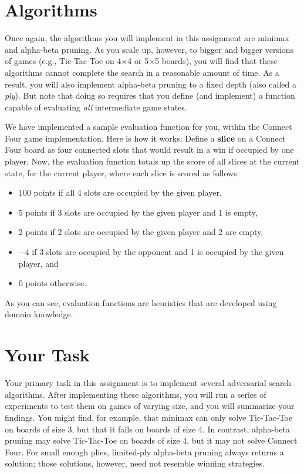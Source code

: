 \documentclass{article}
\begin{document}
\section{Algorithms}
Once again, the algorithms you will implement in this assignment are minimax and alpha-beta pruning.
As you scale up, however, to bigger and bigger versions of games (e.g., Tic-Tac-Toe on 4$\times$4 or
5$\times$5 boards),
you will find that these algorithms cannot complete the search in a reasonable amount of time.
As a result, you will also implement alpha-beta pruning to a fixed depth (also called a \textit{ply}).
But note that doing so requires that you define (and implement) a function
capable of evaluating \emph{all\/} intermediate game states.

We have implemented a sample evaluation function for you, within the Connect Four game implementation.
Here is how it works:
Define a \textbf{slice} on a Connect Four board as
four connected slots that would result in a win if occupied by one player.
Now, the evaluation function totals up the score of all slices at the current state,
for the current player, where each slice is scored as follows:
\begin{itemize}
  \item 100 points if all 4 slots are occupied by the given player,
  \item 5 points if 3 slots are occupied by the given player and 1 is empty,
  \item 2 points if 2 slots are occupied by the given player and 2 are empty,
  \item $-$4 if 3 slots are occupied by the opponent and 1 is occupied by the given player, and
  \item 0 points otherwise.
\end{itemize}
As you can see, evaluation functions are heuristics that are developed using domain knowledge.


\section{Your Task}
Your primary task in this assignment is to implement several adversarial search algorithms.
After implementing these algorithms, you will run a series of experiments to test them on games of varying size,
and you will summarize your findings.
You might find, for example, that minimax can only solve Tic-Tac-Toe on boards of size 3,
but that it fails on boards of size 4.
In contrast, alpha-beta pruning may solve Tic-Tac-Toe on boards of size 4,
but it may not solve Connect Four.
For small enough plies, limited-ply alpha-beta pruning always returns a solution;
those solutions, however, need not resemble winning strategies.
\end{document}
